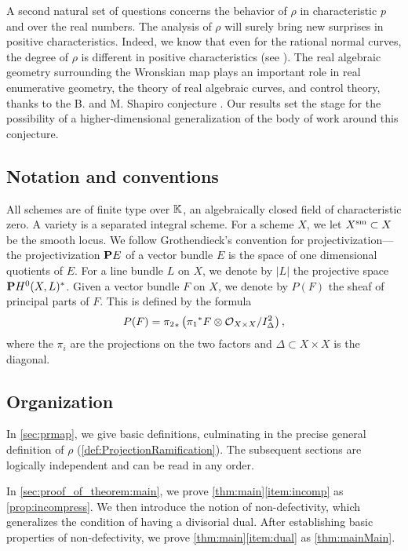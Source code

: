 A second natural set of questions concerns the behavior of $\rho$ in characteristic $p$ and over the real numbers.
The analysis of $\rho$ will surely bring new surprises in positive characteristics.
Indeed, we know that even for the rational normal curves, the degree of $\rho$ is different in positive characteristics (see \cite{oss:06}).
The real algebraic geometry surrounding the Wronskian map plays an important role in real enumerative geometry, the theory of real algebraic curves, and control theory, thanks to the B. and M. Shapiro conjecture \cite{sot:00, ere.gab:02}.
Our results set the stage for the possibility of a higher-dimensional generalization of the body of work around this conjecture.

\subsection{Notation and conventions}
All schemes are of finite type over $\k$, an algebraically closed field of characteristic zero.
A variety is a separated integral scheme.
For a scheme $X$, we let $X^{\rm sm} \subset X$ be the smooth locus.
We follow Grothendieck's convention for projectivization---the projectivization $\P E$ of a vector bundle $E$ is the space of one dimensional quotients of $E$.
For a line bundle $L$ on $X$, we denote by $|L|$ the projective space $\P H^0(X, L)^*$.
Given a vector bundle $F$ on $X$, we denote by $P(F)$ the sheaf of principal parts of $F$.
This is defined by the formula
\[ P(F) = {\pi_2}_* \left( {\pi_1}^* F \otimes \mathcal \O_{X \times X}/ I_{\Delta}^2 \right),\]
where the $\pi_i$ are the projections on the two factors and $\Delta \subset X \times X$ is the diagonal.

\subsection{Organization}
In \autoref{sec:prmap}, we give basic definitions, culminating in the precise general definition of $\rho$ (\autoref{def:ProjectionRamification}).
The subsequent sections are logically independent and can be read in any order.

In \autoref{sec:proof_of_theorem:main}, we prove \autoref{thm:main}\eqref{item:incomp} as \autoref{prop:incompress}.
We then introduce the notion of non-defectivity, which generalizes the condition of having a divisorial dual.
After establishing basic properties of non-defectivity, we prove \autoref{thm:main}\eqref{item:dual} as \autoref{thm:mainMain}.

